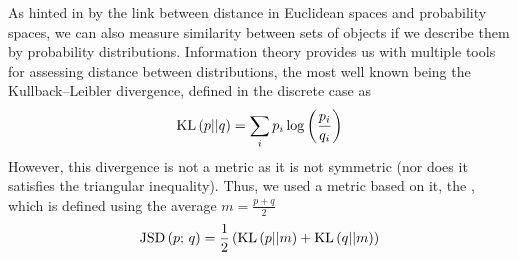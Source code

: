 As hinted in \emd{} by the link between distance in Euclidean spaces and
probability spaces, we can also measure similarity between sets of objects if we
describe them by probability distributions. Information theory provides us with
multiple tools for assessing distance between distributions, the most well known
being the Kullback--Leibler divergence, defined in the discrete case as
\begin{equation*}
	\mathrm{KL}\left(p||q\right) = \sum_i p_i\log\left(\frac{p_i}{q_i}\right) 
\end{equation*}
However, this divergence is not a metric as it is not symmetric (nor does it
satisfies the triangular inequality). Thus, we used a metric based on it, the
 \autocite{JensenShannon03}, which is
defined using the average $m=\frac{p+q}{2}$
\begin{equation*}
	\mathrm{JSD}\left(p;\,q\right) = \frac{1}{2}\left(\mathrm{KL}\left(p||m\right) + \mathrm{KL}\left(q||m\right)\right) 
\end{equation*}
